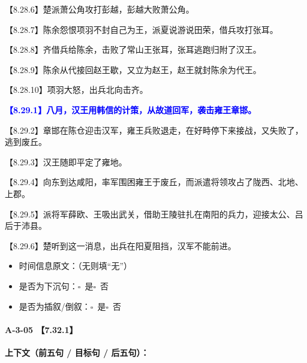 \documentclass[fontset=none,11pt,a4paper]{ctexart}
\newcommand{\answerline}[1]{\underline{\hspace{#1}}}
\newcommand{\choicebox}[1]{$\square$~#1}
\begin{document}
\noindent 【8.28.6】楚派萧公角攻打彭越，彭越大败萧公角。\par
\noindent 【8.28.7】陈余怨恨项羽不封自己为王，派夏说游说田荣，借兵攻打张耳。\par
\noindent 【8.28.8】齐借兵给陈余，击败了常山王张耳，张耳逃跑归附了汉王。\par
\noindent 【8.28.9】陈余从代接回赵王歇，又立为赵王，赵王就封陈余为代王。\par
\noindent 【8.28.10】项羽大怒，出兵北向击齐。\par
\noindent \textcolor{blue}{\textbf{【8.29.1】八月，汉王用韩信的计策，从故道回军，袭击雍王章邯。}}\par
\noindent 【8.29.2】章邯在陈仓迎击汉军，雍王兵败退走，在好畤停下来接战，又失败了，逃到废丘。\par
\noindent 【8.29.3】汉王随即平定了雍地。\par
\noindent 【8.29.4】向东到达咸阳，率军围困雍王于废丘，而派遣将领攻占了陇西、北地、上郡。\par
\noindent 【8.29.5】派将军薛欧、王吸出武关，借助王陵驻扎在南阳的兵力，迎接太公、吕后于沛县。\par
\noindent 【8.29.6】楚听到这一消息，出兵在阳夏阻挡，汉军不能前进。\par

\begin{itemize}
  \item 时间信息原文：\answerline{7.5cm}（无则填“无”）
  \item 是否为下沉句：\choicebox{是}\quad \choicebox{否}
  \item 是否为插叙/倒叙：\choicebox{是}\quad \choicebox{否}
\end{itemize}

\paragraph{A-3-05 \quad 【7.32.1】}
\textbf{上下文（前五句 / 目标句 / 后五句）：}
\end{document}
